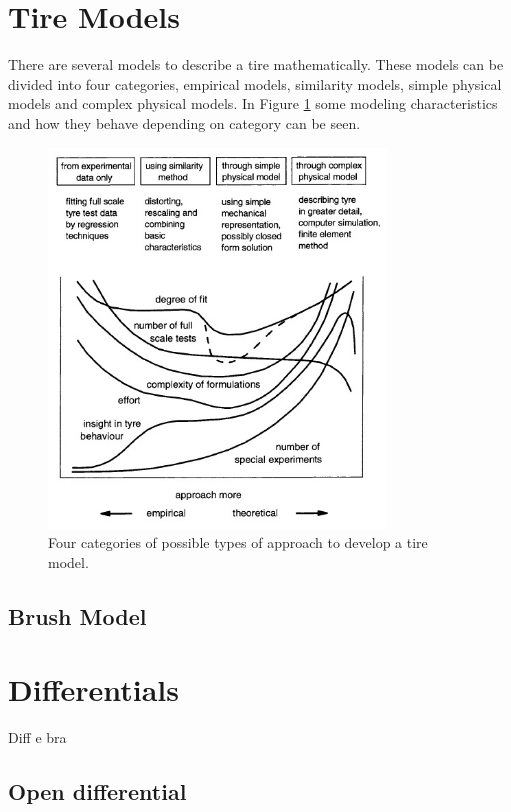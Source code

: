 \section{Tire Models}

There are several models to describe a tire mathematically. These models can be divided into four categories, empirical models, similarity models, simple physical models and complex physical  models. In Figure \ref{tire_modeling} some modeling characteristics and how they behave depending on category can be seen.

\begin{figure}[h]
	\centering
	\includegraphics[width=0.8\textwidth]{Pictures/tire_modeling}
	\caption{Four categories of possible types of approach to develop a tire model. \cite{pacejka}}
	\label{tire_modeling}
\end{figure}


\subsection{Brush Model}



\section{Differentials}

Diff e bra

\subsection{Open differential}


